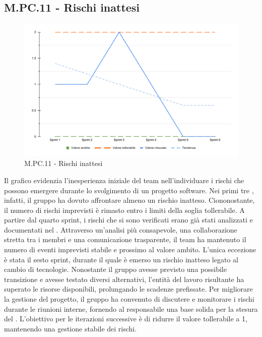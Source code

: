 \subsection{M.PC.11 - Rischi inattesi}
\begin{figure}[H]
    \centering
    \includegraphics[width=\textwidth]{assets/rischi_inattesi.pdf}
    \caption{M.PC.11 - Rischi inattesi}
\end{figure}

\par Il grafico evidenzia l’inesperienza iniziale del team nell’individuare i rischi che possono emergere durante lo svolgimento di un progetto software. Nei primi tre , infatti, il gruppo ha dovuto affrontare almeno un rischio inatteso. Ciononostante, il numero di rischi imprevisti è rimasto entro i limiti della soglia tollerabile. A partire dal quarto sprint, i rischi che si sono verificati erano già stati analizzati e documentati nel \PdP. Attraverso un’analisi più consapevole, una collaborazione stretta tra i membri e una comunicazione trasparente, il team ha mantenuto il numero di eventi imprevisti stabile e prossimo al valore ambito. L'unica eccezione è stata il sesto sprint, durante il quale è emerso un rischio inatteso legato al cambio di tecnologie. Nonostante il gruppo avesse previsto una possibile transizione e avesse testato diversi  alternativi, l’entità del lavoro risultante ha superato le risorse disponibili, prolungando le scadenze prefissate. Per migliorare la gestione del progetto, il gruppo ha convenuto di discutere e monitorare i rischi durante le riunioni interne, fornendo al responsabile una base solida per la stesura del \PdP. L'obiettivo per le iterazioni successive è di ridurre il valore tollerabile a 1, mantenendo una gestione stabile dei rischi.

